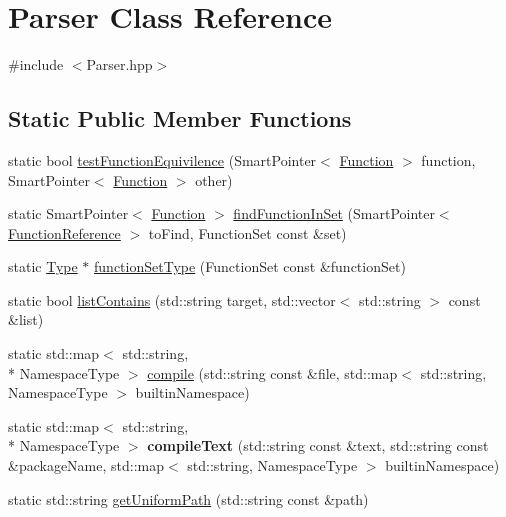 \hypertarget{class_parser}{\section{Parser Class Reference}
\label{class_parser}
}


{\ttfamily \#include $<$Parser.\-hpp$>$}

\subsection*{Static Public Member Functions}
\begin{DoxyCompactItemize}
\item 
static bool \hyperlink{class_parser_a441ecac85709c72d4f23d850e6a68a4b}{test\-Function\-Equivilence} (Smart\-Pointer$<$ \hyperlink{class_a_p_i_1_1_function}{Function} $>$ function, Smart\-Pointer$<$ \hyperlink{class_a_p_i_1_1_function}{Function} $>$ other)
\item 
static Smart\-Pointer$<$ \hyperlink{class_a_p_i_1_1_function}{Function} $>$ \hyperlink{class_parser_a0b76081a569a302b6bcc346b477d1a48}{find\-Function\-In\-Set} (Smart\-Pointer$<$ \hyperlink{class_function_reference}{Function\-Reference} $>$ to\-Find, Function\-Set const \&set)
\item 
static \hyperlink{class_type}{Type} $\ast$ \hyperlink{class_parser_aa83e86cc330a85fdc487447bf81672d1}{function\-Set\-Type} (Function\-Set const \&function\-Set)
\item 
static bool \hyperlink{class_parser_ac35fe3edecea6644af1f55f23a3840c4}{list\-Contains} (std\-::string target, std\-::vector$<$ std\-::string $>$ const \&list)
\item 
static std\-::map$<$ std\-::string, \\*
Namespace\-Type $>$ \hyperlink{class_parser_aed96856c1befcaa93b41cd396c2c5c50}{compile} (std\-::string const \&file, std\-::map$<$ std\-::string, Namespace\-Type $>$ builtin\-Namespace)
\item 
\hypertarget{class_parser_ada7e2a0981fb1d7312307bc2b0a45856}{static std\-::map$<$ std\-::string, \\*
Namespace\-Type $>$ {\bfseries compile\-Text} (std\-::string const \&text, std\-::string const \&package\-Name, std\-::map$<$ std\-::string, Namespace\-Type $>$ builtin\-Namespace)}\label{class_parser_ada7e2a0981fb1d7312307bc2b0a45856}

\item 
static std\-::string \hyperlink{class_parser_aed9dbea45bd44d05cd13eb5533204579}{get\-Uniform\-Path} (std\-::string const \&path)
\end{DoxyCompactItemize}



